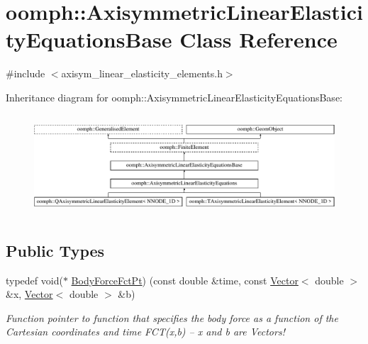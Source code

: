 \hypertarget{classoomph_1_1AxisymmetricLinearElasticityEquationsBase}{}\section{oomph\+:\+:Axisymmetric\+Linear\+Elasticity\+Equations\+Base Class Reference}
\label{classoomph_1_1AxisymmetricLinearElasticityEquationsBase}


{\ttfamily \#include $<$axisym\+\_\+linear\+\_\+elasticity\+\_\+elements.\+h$>$}

Inheritance diagram for oomph\+:\+:Axisymmetric\+Linear\+Elasticity\+Equations\+Base\+:\begin{figure}[H]
\begin{center}
\leavevmode
\includegraphics[height=3.794038cm]{classoomph_1_1AxisymmetricLinearElasticityEquationsBase}
\end{center}
\end{figure}
\subsection*{Public Types}
\begin{DoxyCompactItemize}
\item 
typedef void($\ast$ \hyperlink{classoomph_1_1AxisymmetricLinearElasticityEquationsBase_afa35b69a888eecae4b5f199a1adf88c5}{Body\+Force\+Fct\+Pt}) (const double \&time, const \hyperlink{classoomph_1_1Vector}{Vector}$<$ double $>$ \&x, \hyperlink{classoomph_1_1Vector}{Vector}$<$ double $>$ \&b)
\begin{DoxyCompactList}\small\item\em Function pointer to function that specifies the body force as a function of the Cartesian coordinates and time F\+C\+T(x,b) -- x and b are Vectors! \end{DoxyCompactList}\end{DoxyCompactItemize}
